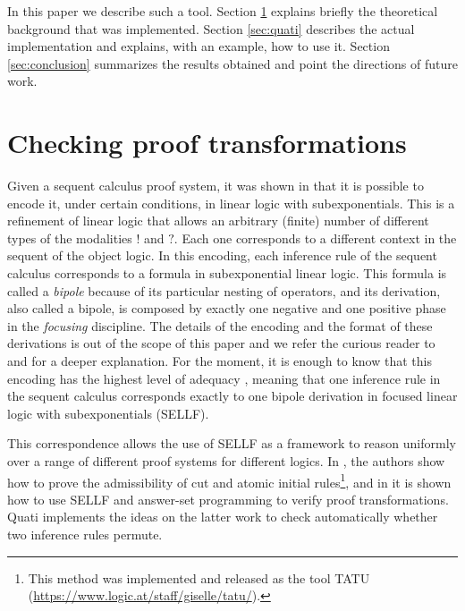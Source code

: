 \documentclass{llncs}
\begin{document}
In this paper we describe such a tool. Section \ref{sec:checking} explains
briefly the theoretical background that was implemented. Section \ref{sec:quati}
describes the actual implementation and explains, with an example, how to use
it. Section \ref{sec:conclusion} summarizes the results obtained and point the
directions of future work.

\section{Checking proof transformations}
\label{sec:checking}


Given a sequent calculus proof system, it was shown in \cite{ENTCS?} that it
is possible to encode it, under certain conditions, in linear logic with
subexponentials. This is a refinement of linear logic that allows an
arbitrary (finite) number of different types of the modalities $!$ and $?$. Each
one corresponds to a different context in the sequent of the object logic. In
this encoding, each inference rule of the sequent calculus corresponds to a
formula in subexponential linear logic. This formula is called a \emph{bipole} because of its
particular nesting of operators, and its derivation, also called a bipole, is composed by exactly one
negative and one positive phase in the \emph{focusing} discipline. The details
of the encoding and the format of these derivations is out of the scope of this
paper and we refer the curious reader to \cite{llinda} and \cite{JLC paper} for
a deeper explanation. For the moment, it is enough to know that this encoding
has the highest level of adequacy \cite{adequacy??}, meaning that one inference
rule in the sequent calculus corresponds exactly to one bipole derivation in
focused linear logic with subexponentials (SELLF).

This correspondence allows the use of SELLF as a framework to reason
uniformly over a range of different proof systems for different logics. In
\cite{JLC?}, the authors show how to prove the admissibility of cut and atomic
initial rules\footnote{This method was implemented and released as the tool
TATU (\url{https://www.logic.at/staff/giselle/tatu/}).}, and in \cite{iclp
paper} it is shown how to use SELLF and answer-set programming to verify proof
transformations. Quati implements the ideas on the latter work to check
automatically whether two inference rules permute. 
\end{document}
